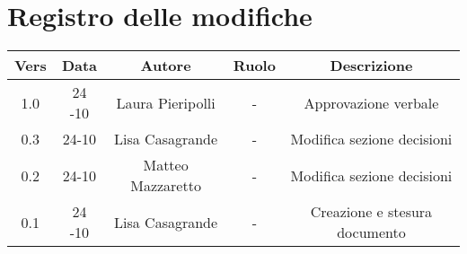 \section{Registro delle modifiche}

\begin{table}[htbp]
	\begin{tabular}{|c|c|c|c|c|}
		\hline
		\rowcolor[gray]{0.9}
		Vers & Data & Autore & Ruolo & Descrizione \\
		\hline
		1.0 & 24 -10 & Laura Pieripolli & - & Approvazione verbale \\
                    \hline
		0.3 & 24-10 & Lisa Casagrande & - & Modifica sezione decisioni \\
		\hline
		0.2 & 24-10 & Matteo Mazzaretto & - & Modifica sezione decisioni \\
		\hline
		0.1 & 24 -10 & Lisa Casagrande & - & Creazione e stesura documento \\
		\hline
	\end{tabular}
\end{table}